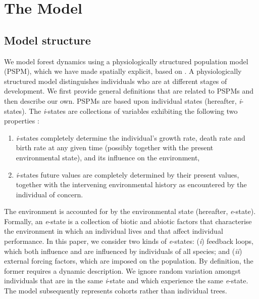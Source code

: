
\section{The Model}
\subsection{Model structure}
We model forest dynamics using a physiologically structured population model (PSPM), which we have made spatially explicit, based on \citet{Strigul2008}. A physiologically structured model distinguishes individuals who are at different stages of development. We first provide general definitions that are related to PSPMs and then describe our own. PSPMs are based upon individual states (hereafter, \textit{i}-states). The \textit{i}-states are collections of variables exhibiting the following two properties \citep[for an overview of PSPMs]{DeRoos1997}:
\begin{enumerate}[label=(\roman*)]
	\item \textit{i}-states completely determine the individual's growth rate, death rate and birth rate  at any given time (possibly together with the present environmental state), and its influence on the environment,
	\item \textit{i}-states future values are completely determined by their present values, together with the intervening environmental history as encountered by the individual of concern.
\end{enumerate}
The environment is accounted for by the environmental state (hereafter, \textit{e}-state). Formally, an \textit{e}-state is a collection of biotic and abiotic factors that characterise the environment in which an individual lives and that affect individual performance. In this paper, we consider two kinds of \textit{e}-states: (\textit{i}) feedback loops, which both influence and are influenced by individuals of all species; and (\textit{ii}) external forcing factors, which are imposed on the population. By definition, the former requires a dynamic description. We ignore random variation amongst individuals that are in the same \textit{i}-state and which experience the same \textit{e}-state. The model subsequently represents cohorts rather than individual trees.

